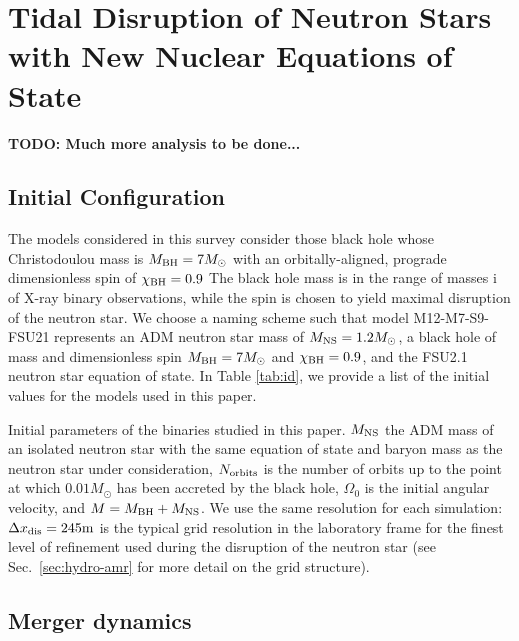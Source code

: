 \chapter{Tidal Disruption of Neutron Stars with New Nuclear Equations of State}
\label{chap:chapter-5}

\textbf{TODO: Much more analysis to be done...}

\section{Initial Configuration}

The models considered in this survey consider those black hole whose Christodoulou mass is $M_{\rm BH} = 7 M_\odot$ with an orbitally-aligned, prograde dimensionless spin of $\chi_{\rm BH} = 0.9$  The black hole mass is in the range of masses i of X-ray binary observations, while the spin is chosen to yield maximal disruption of the neutron star.  We choose a naming scheme such that model M12-M7-S9-FSU21 represents an ADM neutron star mass of $M_{\rm NS} = 1.2 M_\odot$, a black hole of mass and dimensionless spin $M_{\rm BH} = 7 M_\odot$ and $\chi_{\rm BH} = 0.9$, and the FSU2.1 neutron star equation of state.  In Table \ref{tab:id}, we provide a list of the initial values for the models used in this paper.  

\begin{table}
	\begin{center}
	\caption[Initial parameters of binaries used in this survey]{
		Initial parameters of the binaries studied in this paper. 
		$M_{\rm NS}$ the ADM mass of an isolated neutron star with the same equation of state and baryon mass as the neutron star under
		consideration, $N_{\rm orbits}$ is the number of orbits up to the point at which $0.01M_\odot$ has been accreted by the black hole,
		$\Omega_0$ is the initial angular velocity, and $M=M_{\rm BH}+M_{\rm NS}$. We use the same resolution for each simulation: $\Delta x_{\rm dis} = 245{\rm m}$ is the typical grid resolution in the laboratory frame
		for the finest level of refinement used during the disruption of the neutron star (see Sec.~\ref{sec:hydro-amr} for more detail on the grid structure).}
	\label{tab:id}
	{
		
	}
	\end{center}
\end{table}


\section{Merger dynamics}

